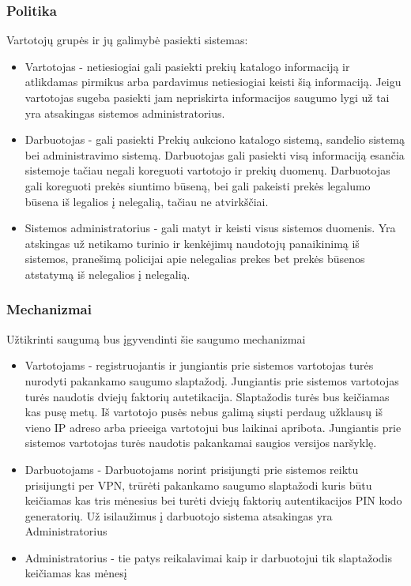 \documentclass{VUMIFPSmagistrinis}
\begin{document}
				\subsubsection{Politika}
					Vartotojų grupės ir jų galimybė pasiekti sistemas:
					\begin{itemize}
						\item{Vartotojas - netiesiogiai gali pasiekti prekių katalogo informaciją ir atlikdamas pirmikus arba pardavimus netiesiogiai keisti šią informaciją. Jeigu vartotojas sugeba pasiekti jam nepriskirta informacijos saugumo lygi už tai yra atsakingas sistemos administratorius.}
						\item{Darbuotojas - gali pasiekti Prekių aukciono katalogo sistemą, sandelio sistemą bei administravimo sistemą. Darbuotojas gali pasiekti visą informaciją esančia sistemoje tačiau negali koreguoti vartotojo ir prekių duomenų. Darbuotojas gali koreguoti prekės siuntimo būseną, bei gali pakeisti prekės legalumo būsena iš legalios į nelegalią, tačiau ne atvirkščiai.}
						\item{Sistemos administratorius - gali matyt ir keisti visus sistemos duomenis. Yra atskingas už netikamo turinio ir kenkėjimų naudotojų panaikinimą iš sistemos, pranešimą policijai apie nelegalias prekes bet prekės būsenos atstatymą iš nelegalios į nelegalią.}
					\end{itemize}
				\subsubsection{Mechanizmai}
					Užtikrinti saugumą bus įgyvendinti šie saugumo mechanizmai
					\begin{itemize}
						\item{Vartotojams - registruojantis ir jungiantis prie sistemos vartotojas turės nurodyti pakankamo saugumo slaptažodį. Jungiantis prie sistemos vartotojas turės naudotis dviejų faktorių autetikacija. Slaptažodis turės bus keičiamas kas pusę metų. Iš vartotojo pusės nebus galimą siųsti perdaug užklausų iš vieno IP adreso arba prieeiga vartotojui bus laikinai apribota. Jungiantis prie sistemos vartotojas turės naudotis pakankamai saugios versijos naršyklę. }
						\item{Darbuotojams -  Darbuotojams norint prisijungti prie sistemos reiktu prisijungti per VPN, trūrėti pakankamo saugumo slaptažodi kuris būtu keičiamas kas tris mėnesius bei turėti dviejų faktorių autentikacijos PIN kodo generatorių. Už isilaužimus į darbuotojo sistema atsakingas yra Administratorius}
						\item{Administratorius - tie patys reikalavimai kaip ir darbuotojui tik slaptažodis keičiamas kas mėnesį}
					\end{itemize}
\end{document}
